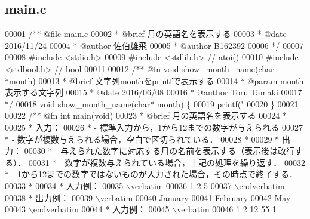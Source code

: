 \subsection{main.\-c}

\begin{DoxyCode}
00001 \textcolor{comment}{/**  @file main.c}
00002 \textcolor{comment}{ *   @brief  月の英語名を表示する}
00003 \textcolor{comment}{ *   @date   2016/11/24}
00004 \textcolor{comment}{ *   @author 佐伯雄飛}
00005 \textcolor{comment}{ *   @author B162392}
00006 \textcolor{comment}{ */}
00007 
00008 \textcolor{preprocessor}{#include <stdio.h>}
00009 \textcolor{preprocessor}{#include <stdlib.h>}   \textcolor{comment}{// atoi()}
00010 \textcolor{preprocessor}{#include <stdbool.h>}  \textcolor{comment}{// bool}
00011 \textcolor{comment}{}
00012 \textcolor{comment}{/** @fn     void show\_month\_name(char *month)}
00013 \textcolor{comment}{ *  @brief  文字列monthをprintfで表示する}
00014 \textcolor{comment}{ *  @param  month 表示する文字列}
00015 \textcolor{comment}{ *  @date   2016/06/08}
00016 \textcolor{comment}{ *  @author Toru Tamaki}
00017 \textcolor{comment}{ */}
00018 \textcolor{keywordtype}{void} show_month_name(\textcolor{keywordtype}{char}* month) \{
00019   printf(\textcolor{stringliteral}{"%
00020 \}
00021 \textcolor{comment}{}
00022 \textcolor{comment}{/** @fn int main(void)}
00023 \textcolor{comment}{ *  @brief 月の英語名を表示する}
00024 \textcolor{comment}{ *}
00025 \textcolor{comment}{ *  入力：}
00026 \textcolor{comment}{ *  - 標準入力から，1から12までの数字が与えられる}
00027 \textcolor{comment}{ *  - 数字が複数与えられる場合，空白で区切られている．}
00028 \textcolor{comment}{ *}
00029 \textcolor{comment}{ *  出力：}
00030 \textcolor{comment}{ *  - 与えられた数字に対応する月の名前を表示する（表示後は改行する）．}
00031 \textcolor{comment}{ *  - 数字が複数与えられている場合，上記の処理を繰り返す．}
00032 \textcolor{comment}{ *  - 1から12までの数字ではないものが入力された場合，その時点で終了する．}
00033 \textcolor{comment}{ *}
00034 \textcolor{comment}{ *  入力例：}
00035 \textcolor{comment}{\(\backslash\)verbatim}
00036 \textcolor{comment}{1 2 5}
00037 \textcolor{comment}{\(\backslash\)endverbatim}
00038 \textcolor{comment}{  *  出力例：}
00039 \textcolor{comment}{\(\backslash\)verbatim}
00040 \textcolor{comment}{January}
00041 \textcolor{comment}{February}
00042 \textcolor{comment}{May}
00043 \textcolor{comment}{\(\backslash\)endverbatim}
00044 \textcolor{comment}{  *  入力例：}
00045 \textcolor{comment}{\(\backslash\)verbatim}
00046 \textcolor{comment}{1 2 12 55 1}
}
\end{DoxyCode}
